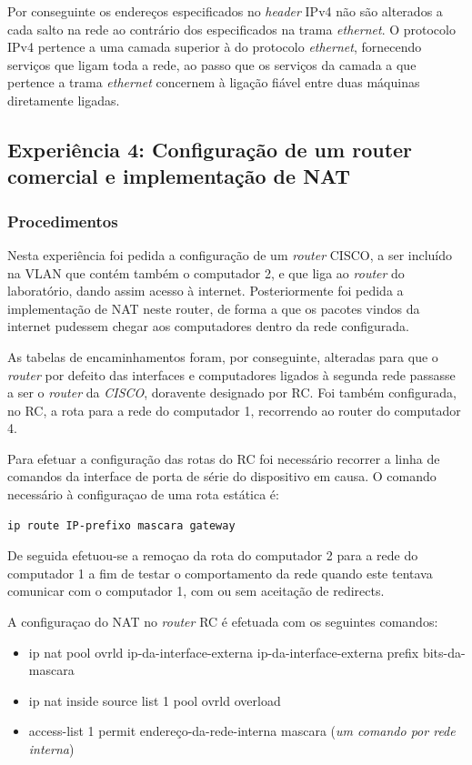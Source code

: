 \documentclass{article}
\begin{document}
Por conseguinte os endereços especificados no \textit{header} IPv4 não são alterados a cada salto na rede ao contrário dos especificados na trama \textit{ethernet}. O protocolo IPv4 pertence a uma camada superior à do protocolo \textit{ethernet}, fornecendo serviços que ligam toda a rede, ao passo que os serviços da camada a que pertence a trama \textit{ethernet} concernem à ligação fiável entre duas máquinas diretamente ligadas.
\newpage
\subsection{Experiência 4: Configuração de um router comercial e implementação de NAT}

\subsubsection{Procedimentos}
Nesta experiência foi pedida a configuração de um \textit{router} CISCO, a ser incluído na VLAN que contém também o computador 2, e que liga ao \textit{router} do laboratório, dando assim acesso à internet. Posteriormente foi pedida a implementação de NAT neste router, de forma a que os pacotes vindos da internet pudessem chegar aos computadores dentro da rede configurada. 

As tabelas de encaminhamentos foram, por conseguinte, alteradas para que o \textit{router} por defeito das interfaces e computadores ligados à segunda rede passasse a ser o \textit{router} da \textit{CISCO}, doravente designado por RC. Foi também configurada, no RC, a rota para a rede do computador 1, recorrendo ao router do computador 4.

Para efetuar a configuração das rotas do RC foi necessário recorrer a linha de comandos da interface de porta de série do dispositivo em causa. O comando necessário à configuraçao de uma rota estática é:

\begin{verbatim}
ip route IP-prefixo mascara gateway
\end{verbatim}

De seguida efetuou-se a remoçao da rota do computador 2 para a rede do computador 1 a fim de testar o comportamento da rede quando este tentava comunicar com o computador 1, com ou sem aceitação de redirects.

A configuraçao do NAT no \textit{router} RC é efetuada com os seguintes comandos:
\begin{itemize}
\item ip nat pool ovrld ip-da-interface-externa ip-da-interface-externa  prefix bits-da-mascara
\item ip nat inside source list 1 pool ovrld overload 
\item access-list 1 permit endereço-da-rede-interna mascara (\textit{um comando por rede interna})
\end{itemize}
\end{document}
